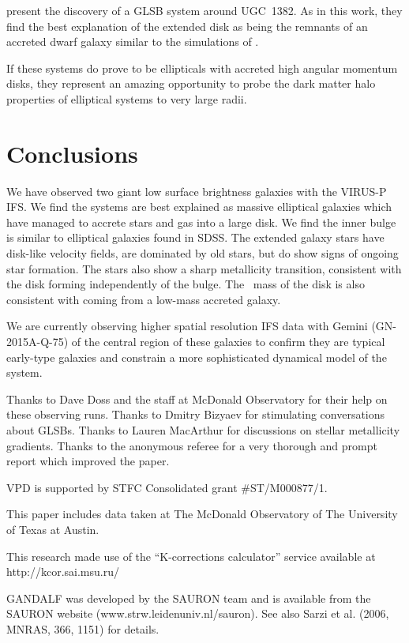 \documentclass[12pt,preprint]{aastex}
\newcommand\HI{\ion{H}{1}}
\begin{document}
\citet{Hagen16} present the discovery of a GLSB system around UGC~1382.
As in this work, they find the best explanation of the extended disk as being the remnants of an accreted dwarf galaxy similar to the simulations of \citet{Pen06}. 

If these systems do prove to be ellipticals with accreted high angular momentum disks, they represent an amazing opportunity to probe the dark matter halo properties of elliptical systems to very large radii. 


\section{Conclusions}\label{sec:conclusions}

We have observed two giant low surface brightness galaxies with the VIRUS-P IFS.
We find the systems are best explained as massive elliptical galaxies which have managed to accrete stars and gas into a large disk.
We find the inner bulge is similar to elliptical galaxies found in SDSS.
The extended galaxy stars have disk-like velocity fields, are dominated by old stars, but do show signs of ongoing star formation. The stars also show a sharp metallicity transition, consistent with the disk forming independently of the bulge. The \HI\ mass of the disk is also consistent with coming from a low-mass accreted galaxy.

We are currently observing higher spatial resolution IFS data with Gemini (GN-2015A-Q-75) of the central region of these galaxies to confirm they are typical early-type galaxies and constrain a more sophisticated dynamical model of the system.

\acknowledgments
Thanks to Dave Doss and the staff at McDonald Observatory for their help on these observing runs. Thanks to Dmitry Bizyaev for stimulating conversations about GLSBs. Thanks to Lauren MacArthur for discussions on stellar metallicity gradients. Thanks to the anonymous referee for a very thorough and prompt report which improved the paper.

VPD is supported by STFC Consolidated grant \#ST/M000877/1.

This paper includes data taken at The McDonald Observatory of The University of Texas at Austin.

This research made use of the ``K-corrections calculator'' service available at http://kcor.sai.msu.ru/

GANDALF was developed by the SAURON team and is available from the SAURON website (www.strw.leidenuniv.nl/sauron). See also Sarzi et al. (2006, MNRAS, 366, 1151) for details.
\end{document}
